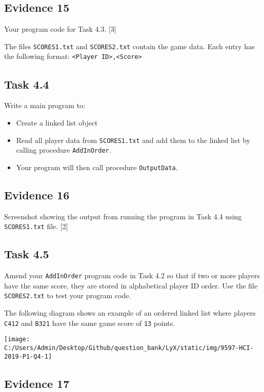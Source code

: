 \subsection*{Evidence 15 }

Your program code for Task 4.3.\hfill{} {[}3{]}

The files \texttt{SCORES1.txt} and \texttt{SCORES2.txt} contain the
game data. Each entry has the following format: \texttt{<Player ID>,<Score>} 

\subsection*{Task 4.4 }

Write a main program to:
\begin{itemize}
\item Create a linked list object 
\item Read all player data from \texttt{SCORES1.txt} and add them to the
linked list by calling procedure \texttt{AddInOrder}. 
\item Your program will then call procedure \texttt{OutputData}.
\end{itemize}

\subsection*{Evidence 16 }

Screenshot showing the output from running the program in Task 4.4
using \texttt{SCORES1.txt} file. \hfill{}{[}2{]}

\subsection*{Task 4.5 }

Amend your \texttt{AddInOrder} program code in Task 4.2 so that if
two or more players have the same score, they are stored in alphabetical
player ID order. Use the file \texttt{SCORES2.txt} to test your program
code.

The following diagram shows an example of an ordered linked list where
players \texttt{C412} and \texttt{B321} have the same game score of
\texttt{13} points. 
\begin{center}
\texttt{[image: C:/Users/Admin/Desktop/Github/question\_bank/LyX/static/img/9597-HCI-2019-P1-Q4-1]}
\par\end{center}

\subsection*{Evidence 17 }

